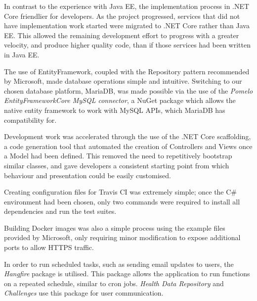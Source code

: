 In contrast to the experience with Java EE, the implementation process in .NET Core friendlier for developers. As the project progressed, services that did not have implementation work started were migrated to .NET Core rather than Java EE. This allowed the remaining development effort to progress with a greater velocity, and produce higher quality code, than if those services had been written in Java EE.

The use of EntityFramework, coupled with the Repository pattern\cite{dotnet_repository_pattern} recommended by Microsoft, made database operations simple and intuitive. Switching to our chosen database platform, MariaDB, was made possible via the use of the \textit{Pomelo EntityFrameworkCore MySQL connector}\cite{Pomelo}, a NuGet package which allows the native entity framework to work with MySQL APIs, which MariaDB has compatibility for.

Development work was accelerated through the use of the .NET Core scaffolding, a code generation tool that automated the creation of Controllers and Views once a Model had been defined. This removed the need to repetitively bootstrap similar classes, and gave developers a consistent starting point from which behaviour and presentation could be easily customised.

Creating configuration files for Travis CI was extremely simple; once the C\# environment had been chosen, only two commands were required to install all dependencies and run the test suites.

Building Docker images was also a simple process using the example files provided by Microsoft\cite{dotnet_docker}, only requiring minor modification to expose additional ports to allow HTTPS traffic.

In order to run scheduled tasks, such as sending email updates to users, the \textit{Hangfire}\cite{hangfire} package is utilised. This package allows the application to run functions on a repeated schedule, similar to cron jobs. \textit{Health Data Repository} and \textit{Challenges} use this package for user communication.